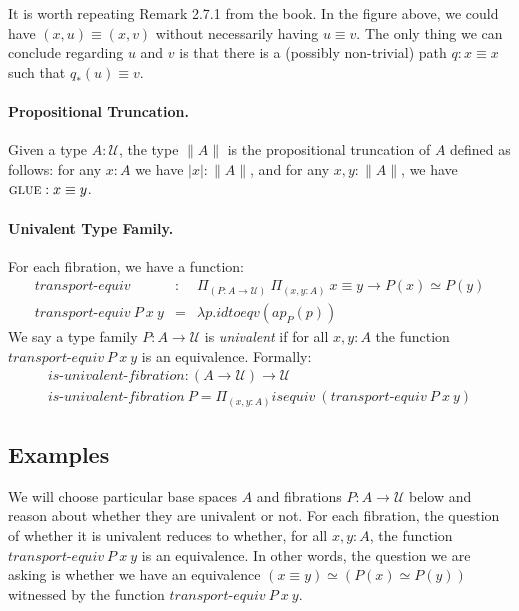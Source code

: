 \documentclass{entcs}
\newcommand{\gluep}{\textsc{glue}}
\begin{document}
\noindent It is worth repeating Remark 2.7.1 from the book. In the figure above,
we could have $(x,u) \equiv (x,v)$ without necessarily having $u \equiv v$. The
only thing we can conclude regarding $u$ and $v$ is that there is a (possibly
non-trivial) path $q : x \equiv x$ such that $q_*(u) \equiv v$.

\paragraph*{Propositional Truncation.} Given a type $A : \mathcal{U}$, the type
$\|A\|$ is the propositional truncation of $A$ defined as follows: for
  any $x:A$ we have $|x| : \|A\|$, and for any $x,y : \|A\|$, we have
  $\gluep : x \equiv y$.

\paragraph*{Univalent Type Family.}
For each fibration, we have a function:
\[\begin{array}{rcl}
\textit {transport-equiv} &:& \Pi_{(P : A \to \mathcal{U})}~ \Pi_{(x,y:A)}~
    x \equiv y  \to P(x) \simeq P(y) \\
\textit{transport-equiv}~P~x~y &=& \lambda p. \mathit{idtoeqv}(\mathit{ap}_{P}(p))
\end{array}\]
We say a type family $P : A \to \mathcal{U}$ is \emph{univalent} if for all
$x,y:A$ the function $\textit{transport-equiv}~P~x~y$ is an
equivalence. Formally:
\[\begin{array}{l}
\textit{is-univalent-fibration} : (A \to \mathcal{U}) \to \mathcal{U} \\
\textit{is-univalent-fibration}~P = \Pi_{(x,y:A)} \textit{isequiv}~(\textit{transport-equiv}~P~x~y)
\end{array}\]

\subsection{Examples}

We will choose particular base spaces $A$ and fibrations $P : A \to \mathcal{U}$
below and reason about whether they are univalent or not. For each fibration,
the question of whether it is univalent reduces to whether, for all $x,y:A$, the
function $\textit{transport-equiv}~P~x~y$ is an equivalence. In other words, the
question we are asking is whether we have an equivalence
$(x \equiv y) \simeq (P(x) \simeq P(y))$ witnessed by the function
$\textit{transport-equiv}~P~x~y$.
\end{document}
